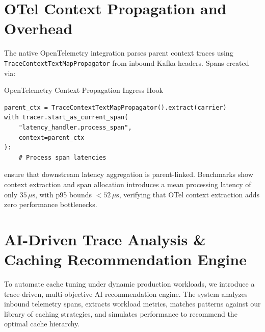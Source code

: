 \documentclass[11pt,a4paper]{article}
\theoremstyle{definition}
\begin{document}
\section{OTel Context Propagation and Overhead}\label{sec:otel}
The native OpenTelemetry integration parses parent context traces using \texttt{TraceContextTextMapPropagator} from inbound Kafka headers. Spans created via:

\begin{vizbox}{OpenTelemetry Context Propagation Ingress Hook}
\begin{verbatim}
parent_ctx = TraceContextTextMapPropagator().extract(carrier)
with tracer.start_as_current_span(
    "latency_handler.process_span",
    context=parent_ctx
):
    # Process span latencies
\end{verbatim}
\end{vizbox}

ensure that downstream latency aggregation is parent-linked. Benchmarks show context extraction and span allocation introduces a mean processing latency of only $35\,\mu\text{s}$, with p95 bounds $< 52\,\mu\text{s}$, verifying that OTel context extraction adds zero performance bottlenecks.



\section{AI-Driven Trace Analysis \& Caching Recommendation Engine}\label{sec:ai-recommendation}
To automate cache tuning under dynamic production workloads, we introduce a trace-driven, multi-objective AI recommendation engine. The system analyzes inbound telemetry spans, extracts workload metrics, matches patterns against our library of caching strategies, and simulates performance to recommend the optimal cache hierarchy.
\end{document}
